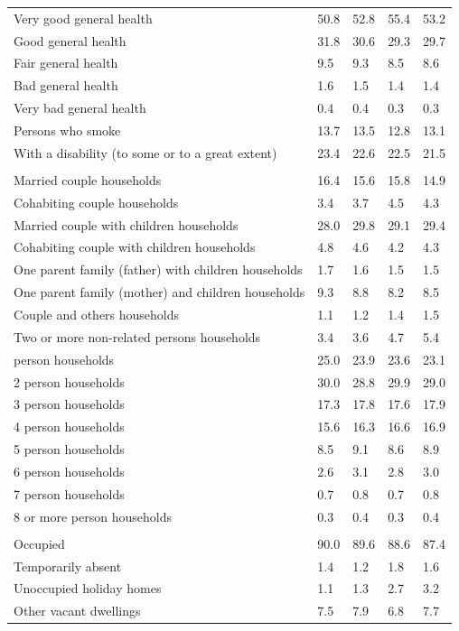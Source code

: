 \documentclass{article}
\begin{document}
\begin{table}[h]
\begin{tabular}{KTTTT}
    \hline
Very good general health & 50.8& 52.8&55.4& 53.2\\
Good general health & 31.8& 30.6& 29.3& 29.7\\
Fair general health & 9.5& 9.3&8.5& 8.6\\
Bad general health & 1.6& 1.5&1.4& 1.4\\
Very bad general health & 0.4& 0.4&0.3& 0.3\\
    \hline
Persons who smoke & 13.7& 13.5&12.8& 13.1\\
    \hline
With a disability (to some or to a great extent) & 23.4& 22.6&22.5& 21.5\\
\hline
    \\ 
    \hline
Married couple households & 16.4& 15.6& 15.8& 14.9\\
Cohabiting couple households & 3.4& 3.7& 4.5& 4.3\\
Married couple with children households & 28.0& 29.8& 29.1& 29.4\\
Cohabiting couple with children households & 4.8& 4.6& 4.2& 4.3\\
One parent family (father) with  children households & 1.7& 1.6& 1.5& 1.5\\
One parent family (mother) and children households & 9.3& 8.8& 8.2& 8.5\\
Couple and others households  & 1.1& 1.2& 1.4& 1.5\\
Two or more non-related persons households & 3.4& 3.6& 4.7& 5.4\\
     person households & 25.0& 23.9& 23.6& 23.1\\
2 person households & 30.0& 28.8& 29.9& 29.0\\
3 person households & 17.3& 17.8& 17.6& 17.9\\
4 person households & 15.6& 16.3& 16.6& 16.9\\
5 person households & 8.5& 9.1& 8.6& 8.9\\
6 person households & 2.6& 3.1& 2.8& 3.0\\
7 person households & 0.7& 0.8& 0.7& 0.8\\
8 or more person households & 0.3& 0.4& 0.3& 0.4\\
\hline
    \\ 
    \hline
Occupied & 90.0& 89.6& 88.6& 87.4\\
Temporarily absent & 1.4& 1.2& 1.8& 1.6\\
Unoccupied holiday homes & 1.1& 1.3& 2.7& 3.2\\
Other vacant dwellings & 7.5& 7.9& 6.8& 7.7\\
\hline
\end{tabular}
\end{table}
\end{document}
